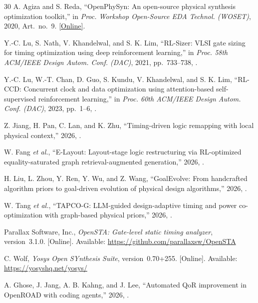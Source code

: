 \documentclass[twocolumn,10pt,fontset=windows]{ctexart}
\begin{document}
\begin{thebibliography}{30}
A. Agiza and S. Reda, ``OpenPhySyn: An open-source physical synthesis optimization toolkit,'' in \emph{Proc. Workshop Open-Source EDA Technol. (WOSET)}, 2020, Art.~no.~9. \href{https://woset-workshop.github.io/PDFs/2020/a09.pdf}{[Online]}.

Y.-C. Lu, S. Nath, V. Khandelwal, and S. K. Lim, ``RL-Sizer: VLSI gate sizing for timing optimization using deep reinforcement learning,'' in \emph{Proc. 58th ACM/IEEE Design Autom. Conf. (DAC)}, 2021, pp.~733--738, .

Y.-C. Lu, W.-T. Chan, D. Guo, S. Kundu, V. Khandelwal, and S. K. Lim, ``RL-CCD: Concurrent clock and data optimization using attention-based self-supervised reinforcement learning,'' in \emph{Proc. 60th ACM/IEEE Design Autom. Conf. (DAC)}, 2023, pp.~1--6, .

Z. Jiang, H. Pan, C. Lan, and K. Zhu, ``Timing-driven logic remapping with local physical context,'' 2026, .

W. Fang \emph{et al.}, ``E-Layout: Layout-stage logic restructuring via RL-optimized equality-saturated graph retrieval-augmented generation,'' 2026, .

H. Liu, L. Zhou, Y. Ren, Y. Wu, and Z. Wang, ``GoalEvolve: From handcrafted algorithm priors to goal-driven evolution of physical design algorithms,'' 2026, .

W. Tang \emph{et al.}, ``TAPCO-G: LLM-guided design-adaptive timing and power co-optimization with graph-based physical priors,'' 2026, .

Parallax Software, Inc., \emph{OpenSTA: Gate-level static timing analyzer}, version~3.1.0. [Online]. Available: \url{https://github.com/parallaxsw/OpenSTA}

C. Wolf, \emph{Yosys Open SYnthesis Suite}, version~0.70+255. [Online]. Available: \url{https://yosyshq.net/yosys/}

A. Ghose, J. Jang, A. B. Kahng, and J. Lee, ``Automated QoR improvement in OpenROAD with coding agents,'' 2026, .

\end{thebibliography}
\endgroup
\end{document}
